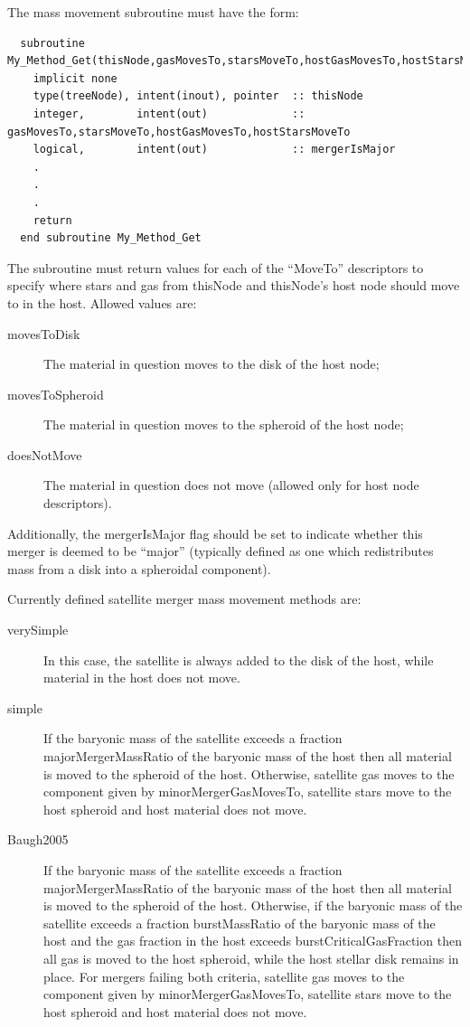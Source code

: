 The mass movement subroutine must have the form:
\begin{verbatim}
  subroutine My_Method_Get(thisNode,gasMovesTo,starsMoveTo,hostGasMovesTo,hostStarsMoveTo,mergerIsMajor)
    implicit none
    type(treeNode), intent(inout), pointer  :: thisNode
    integer,        intent(out)             :: gasMovesTo,starsMoveTo,hostGasMovesTo,hostStarsMoveTo
    logical,        intent(out)             :: mergerIsMajor
    .
    .
    .
    return
  end subroutine My_Method_Get
\end{verbatim}
The subroutine must return values for each of the ``{\normalfont \ttfamily MoveTo}'' descriptors to specify where stars and gas from {\normalfont \ttfamily thisNode} and {\normalfont \ttfamily thisNode}'s host node should move to in the host. Allowed values are:
\begin{description}
 \item [{\normalfont \ttfamily movesToDisk}] The material in question moves to the disk of the host node;
 \item [{\normalfont \ttfamily movesToSpheroid}] The material in question moves to the spheroid of the host node;
 \item [{\normalfont \ttfamily doesNotMove}] The material in question does not move (allowed only for host node descriptors).
\end{description}
Additionally, the {\normalfont \ttfamily mergerIsMajor} flag should be set to indicate whether this merger is deemed to be ``major'' (typically defined as one which redistributes mass from a disk into a spheroidal component).

Currently defined satellite merger mass movement methods are:
\begin{description}
 \item [{\normalfont \ttfamily verySimple}] In this case, the satellite is always added to the disk of the host, while material in the host does not move.
 \item [{\normalfont \ttfamily simple}] If the baryonic mass of the satellite exceeds a fraction {\normalfont \ttfamily majorMergerMassRatio} of the baryonic mass of the host then all material is moved to the spheroid of the host. Otherwise, satellite gas moves to the component given by {\normalfont \ttfamily minorMergerGasMovesTo}, satellite stars move to the host spheroid and host material does not move.
 \item [{\normalfont \ttfamily Baugh2005}] If the baryonic mass of the satellite exceeds a fraction {\normalfont \ttfamily majorMergerMassRatio} of the baryonic mass of the host then all material is moved to the spheroid of the host. Otherwise, if the baryonic mass of the satellite exceeds a fraction {\normalfont \ttfamily burstMassRatio} of the baryonic mass of the host and the gas fraction in the host exceeds {\normalfont \ttfamily burstCriticalGasFraction} then all gas is moved to the host spheroid, while the host stellar disk remains in place. For mergers failing both criteria, satellite gas moves to the component given by {\normalfont \ttfamily minorMergerGasMovesTo}, satellite stars move to the host spheroid and host material does not move. 
\end{description}

